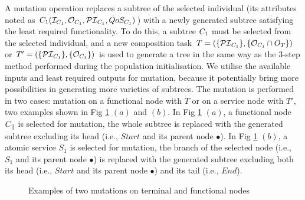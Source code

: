 A mutation operation replaces a subtree of the selected individual (its attributes noted as $C_1 (\mathcal{I}_{C_1}, \mathcal{O}_{C_1}, \mathcal{PI}_{C_1}, QoS_{C_1})$) with a newly generated subtree satisfying the least required functionality. To do this, a subtree $C_1$ must be selected from the selected individual, and a new composition task $T=(\{\mathcal{PI}_{C_1}\},\{\mathcal{O}_{C_1} \cap O_T\})$ or $T'=(\{\mathcal{PI}_{C_1}\},\{\mathcal{O}_{C_1}\})$ is used to generate a tree in the same way as the 3-step method performed during the population initialisation. We utilise the available inputs and least required outputs for mutation, because it potentially bring more possibilities in generating more varieties of subtrees. The mutation is performed in two cases: mutation on a functional node with $T$ or on a service node with $T'$, two examples shown in Fig \ref{mutationExample} $(a)$ and $(b)$. In Fig \ref{mutationExample} $(a)$, a functional node $C_{\parallel}$ is selected for mutation, the whole subtree is replaced with the generated subtree excluding its head (i.e., $Start$ and its parent node $\bullet$). In Fig \ref{mutationExample} $(b)$, a atomic service $S_1$ is selected for mutation, the branch of the selected node (i.e., $S_1$ and its parent node $\bullet$) is replaced with the generated subtree excluding both its head (i.e., $Start$ and its parent node $\bullet$) and its tail (i.e., $End$).

\begin{figure}[h!tb]
\centering
 \caption{Examples of two mutations on terminal and functional nodes}
 \label{mutationExample}
\end{figure}

